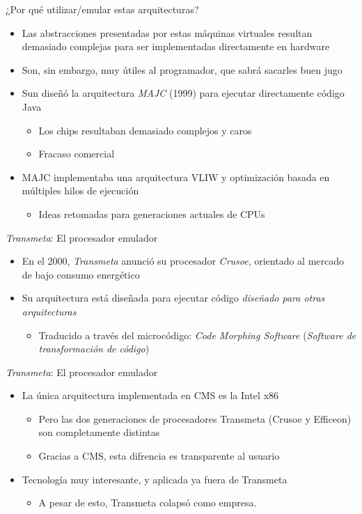 \documentclass[presentation]{beamer}
\begin{document}
\begin{frame}[label={sec:org96e5fcf}]{¿Por qué utilizar/emular estas arquitecturas?}
\begin{itemize}
\item Las abstracciones presentadas por estas máquinas virtuales resultan
demasiado complejas para ser implementadas directamente en hardware
\item Son, sin embargo, muy útiles al programador, que sabrá sacarles buen
jugo
\item Sun diseñó la arquitectura \emph{MAJC} (1999) para ejecutar directamente
código Java
\begin{itemize}
\item Los chips resultaban demasiado complejos y caros
\item Fracaso comercial
\end{itemize}
\item MAJC implementaba una arquitectura VLIW y optimización basada en
múltiples hilos de ejecución
\begin{itemize}
\item Ideas retomadas para generaciones actuales de CPUs
\end{itemize}
\end{itemize}
\end{frame}

\begin{frame}[label={sec:orgdd0d488}]{\emph{Transmeta}: El procesador emulador}
\begin{itemize}
\item En el 2000, \emph{Transmeta} anunció su procesador \emph{Crusoe}, orientado al
mercado de bajo consumo energético
\item Su arquitectura está diseñada para ejecutar código \emph{diseñado para
otras arquitecturas}
\begin{itemize}
\item Traducido a través del microcódigo: \emph{Code Morphing Software}
(\emph{Software de transformación de código})
\end{itemize}
\end{itemize}
\end{frame}
\begin{frame}[label={sec:org5ac94d2}]{\emph{Transmeta}: El procesador emulador}
\begin{itemize}
\item La única arquitectura implementada en CMS es la Intel x86
\begin{itemize}
\item Pero las dos generaciones de procesadores Transmeta (Crusoe y
Efficeon) son completamente distintas
\item Gracias a CMS, esta difrencia es transparente al usuario
\end{itemize}
\item Tecnología muy interesante, y aplicada ya fuera de Transmeta
\begin{itemize}
\item A pesar de esto, Transmeta colapsó como empresa.
\end{itemize}
\end{itemize}
\end{frame}
\end{document}
